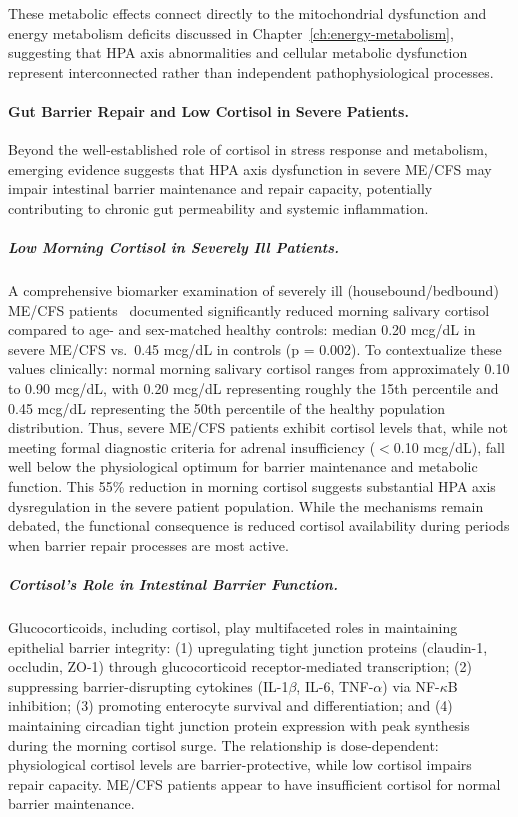 These metabolic effects connect directly to the mitochondrial dysfunction and energy metabolism deficits discussed in Chapter~\ref{ch:energy-metabolism}, suggesting that HPA axis abnormalities and cellular metabolic dysfunction represent interconnected rather than independent pathophysiological processes.

\paragraph{Gut Barrier Repair and Low Cortisol in Severe Patients.}

Beyond the well-established role of cortisol in stress response and metabolism, emerging evidence suggests that HPA axis dysfunction in severe ME/CFS may impair intestinal barrier maintenance and repair capacity, potentially contributing to chronic gut permeability and systemic inflammation.

\subparagraph{Low Morning Cortisol in Severely Ill Patients.}
A comprehensive biomarker examination of severely ill (housebound/bedbound) ME/CFS patients~\cite{Komaroff2021severe} documented significantly reduced morning salivary cortisol compared to age- and sex-matched healthy controls: median 0.20 mcg/dL in severe ME/CFS vs.\ 0.45 mcg/dL in controls (p = 0.002). To contextualize these values clinically: normal morning salivary cortisol ranges from approximately 0.10 to 0.90 mcg/dL, with 0.20 mcg/dL representing roughly the 15th percentile and 0.45 mcg/dL representing the 50th percentile of the healthy population distribution. Thus, severe ME/CFS patients exhibit cortisol levels that, while not meeting formal diagnostic criteria for adrenal insufficiency ($<$0.10 mcg/dL), fall well below the physiological optimum for barrier maintenance and metabolic function. This 55\% reduction in morning cortisol suggests substantial HPA axis dysregulation in the severe patient population. While the mechanisms remain debated, the functional consequence is reduced cortisol availability during periods when barrier repair processes are most active.

\subparagraph{Cortisol's Role in Intestinal Barrier Function.}
Glucocorticoids, including cortisol, play multifaceted roles in maintaining epithelial barrier integrity: (1) upregulating tight junction proteins (claudin-1, occludin, ZO-1) through glucocorticoid receptor-mediated transcription; (2) suppressing barrier-disrupting cytokines (IL-1$\beta$, IL-6, TNF-$\alpha$) via NF-$\kappa$B inhibition; (3) promoting enterocyte survival and differentiation; and (4) maintaining circadian tight junction protein expression with peak synthesis during the morning cortisol surge. The relationship is dose-dependent: physiological cortisol levels are barrier-protective, while low cortisol impairs repair capacity. ME/CFS patients appear to have insufficient cortisol for normal barrier maintenance.

